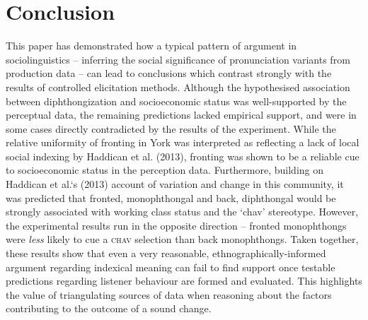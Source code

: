 \documentclass[PWPL]{article}
\begin{document}
\section{Conclusion}
This paper has demonstrated how a typical pattern of argument in sociolinguistics -- inferring the social significance of pronunciation variants from production data -- can lead to conclusions which contrast strongly with the results of controlled elicitation methods. Although the hypothesised association between  diphthongization and socioeconomic status was well-supported by the perceptual data, the remaining predictions lacked empirical support, and were in some cases directly contradicted by the results of the experiment. While the relative uniformity of  fronting in York was interpreted as reflecting a lack of local social indexing by Haddican et al. (2013),  fronting was shown to be a reliable cue to socioeconomic status in the perception data. Furthermore, building on Haddican et al.`s (2013) account of variation and change in this community, it was predicted that fronted, monophthongal and back, diphthongal  would be strongly associated with working class status and the `chav' stereotype. However, the experimental results run in the opposite direction  -- fronted  monophthongs were \textit{less} likely to cue a \textsc{chav} selection than back monophthongs. Taken together, these results show that even a very reasonable, ethnographically-informed argument regarding indexical meaning can fail to find support once testable predictions regarding listener behaviour are formed and evaluated. This highlights the value of triangulating sources of data when reasoning about the factors contributing to the outcome of a sound change.
\end{document}
